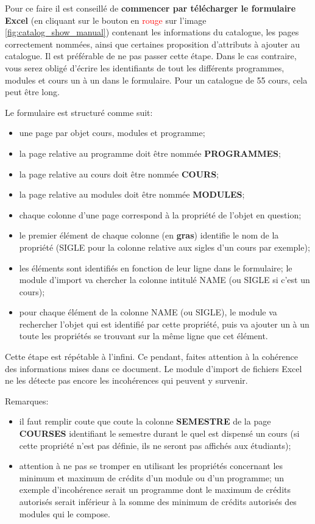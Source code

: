  


Pour ce faire il est conseillé  de \textbf{commencer par télécharger le formulaire Excel} (en cliquant sur le bouton en \textcolor{red}{rouge} sur l'image \ref{fig:catalog_show_manual}) contenant les informations du catalogue, les pages correctement nommées, ainsi que certaines proposition d'attributs à ajouter au catalogue. Il est préférable de ne pas passer cette étape. Dans le cas contraire, vous serez obligé d'écrire les identifiants de tout les différents programmes, modules et cours un à un dans le formulaire. Pour un catalogue de 55 cours, cela peut être long. 

Le formulaire est structuré comme suit:
\begin{itemize}
\item une page par objet cours, modules et programme;
\item la page relative au programme doit être nommée \textbf{PROGRAMMES};
\item la page relative au cours doit être nommée \textbf{COURS};
\item la page relative au modules doit être nommée \textbf{MODULES};
\item chaque colonne d'une page correspond à la propriété de l'objet en question;
\item le premier élément de chaque colonne (en \textbf{gras}) identifie le nom de la propriété (SIGLE pour la colonne relative aux sigles d'un cours par exemple);
\item les éléments sont identifiés en fonction de leur ligne dans le formulaire; le module d'import va chercher la colonne intitulé NAME (ou SIGLE si c'est un cours);
\item pour chaque élément de la colonne NAME (ou SIGLE), le module va rechercher l'objet qui est identifié par cette propriété, puis va ajouter un à un toute les propriétés se trouvant sur la même ligne que cet élément. 
\end{itemize}

Cette étape est répétable à l’infini. Ce pendant, faites attention à la cohérence des informations mises dans ce document. Le module d'import de fichiers Excel ne les détecte pas encore les incohérences qui peuvent y survenir. 

Remarques:
\begin{itemize}
\item il faut remplir coute que coute la colonne \textbf{SEMESTRE} de la page \textbf{COURSES} identifiant le semestre durant le quel est dispensé un cours (si cette propriété n'est pas définie, ils ne seront pas affichés aux étudiants);
\item attention à ne pas se tromper en utilisant les propriétés concernant les minimum et maximum de crédits d'un module ou d'un programme; un exemple d'incohérence serait un programme dont le maximum de crédits autorisés serait inférieur à la somme des minimum de crédits autorisés des modules qui le compose.
\end{itemize}



